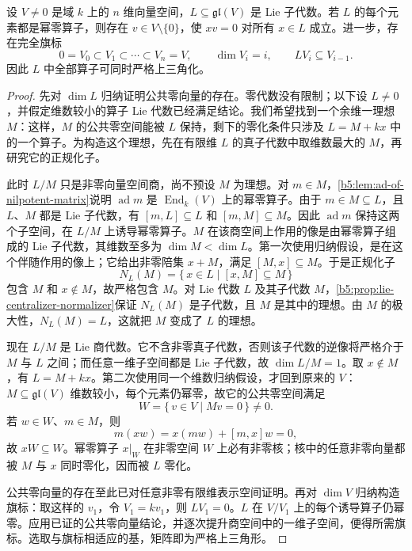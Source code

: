 \begin{theorem}\label{b5:thm:engel-common-zero}
	设 \(V\ne0\) 是域 \(k\) 上的 \(n\) 维向量空间，\(L\subseteq\mathfrak{gl}(V)\) 是 Lie 子代数。若 \(L\) 的每个元素都是幂零算子，则存在 \(v\in V\setminus\{0\}\)，使 \(xv=0\) 对所有 \(x\in L\) 成立。进一步，存在完全旗标
	\[
		0=V_0\subset V_1\subset\cdots\subset V_n=V,\qquad \dim V_i=i,\qquad LV_i\subseteq V_{i-1}.
	\]
	因此 \(L\) 中全部算子可同时严格上三角化。
\end{theorem}
\begin{proof}
	先对 \(\dim L\) 归纳证明公共零向量的存在。零代数没有限制；以下设 \(L\ne0\)，并假定维数较小的算子 Lie 代数已经满足结论。我们希望找到一个余维一理想 \(M\)：这样，\(M\) 的公共零空间能被 \(L\) 保持，剩下的零化条件只涉及 \(L=M+kx\) 中的一个算子。为构造这个理想，先在有限维 \(L\) 的真子代数中取维数最大的 \(M\)，再研究它的正规化子。

	此时 \(L/M\) 只是非零向量空间商，尚不预设 \(M\) 为理想。对 \(m\in M\)，\cref{b5:lem:ad-of-nilpotent-matrix}说明 \(\operatorname{ad}m\) 是 \(\operatorname{End}_k(V)\) 上的幂零算子。由于 \(m\in M\subseteq L\)，且 \(L\)、\(M\) 都是 Lie 子代数，有 \([m,L]\subseteq L\) 和 \([m,M]\subseteq M\)。因此 \(\operatorname{ad}m\) 保持这两个子空间，在 \(L/M\) 上诱导幂零算子。\(M\) 在该商空间上作用的像是由幂零算子组成的 Lie 子代数，其维数至多为 \(\dim M<\dim L\)。第一次使用归纳假设，是在这个伴随作用的像上；它给出非零陪集 \(x+M\)，满足 \([M,x]\subseteq M\)。于是正规化子
	\[
		N_L(M)=\bigl\{\,x\in L\mid[x,M]\subseteq M\,\bigr\}
	\]
	包含 \(M\) 和 \(x\notin M\)，故严格包含 \(M\)。对 Lie 代数 \(L\) 及其子代数 \(M\)，\cref{b5:prop:lie-centralizer-normalizer}保证 \(N_L(M)\) 是子代数，且 \(M\) 是其中的理想。由 \(M\) 的极大性，\(N_L(M)=L\)，这就把 \(M\) 变成了 \(L\) 的理想。

	现在 \(L/M\) 是 Lie 商代数。它不含非零真子代数，否则该子代数的逆像将严格介于 \(M\) 与 \(L\) 之间；而任意一维子空间都是 Lie 子代数，故 \(\dim L/M=1\)。取 \(x\notin M\)，有 \(L=M+kx\)。第二次使用同一个维数归纳假设，才回到原来的 \(V\)：\(M\subseteq\mathfrak{gl}(V)\) 维数较小，每个元素仍幂零，故它的公共零空间满足
	\[
		W=\{\,v\in V\mid Mv=0\,\}\ne0.
	\]
	若 \(w\in W\)、\(m\in M\)，则
	\[
		m(xw)=x(mw)+[m,x]w=0,
	\]
	故 \(xW\subseteq W\)。幂零算子 \(x|_W\) 在非零空间 \(W\) 上必有非零核；核中的任意非零向量都被 \(M\) 与 \(x\) 同时零化，因而被 \(L\) 零化。

	公共零向量的存在至此已对任意非零有限维表示空间证明。再对 \(\dim V\) 归纳构造旗标：取这样的 \(v_1\)，令 \(V_1=kv_1\)，则 \(LV_1=0\)。\(L\) 在 \(V/V_1\) 上的每个诱导算子仍幂零。应用已证的公共零向量结论，并逐次提升商空间中的一维子空间，便得所需旗标。选取与旗标相适应的基，矩阵即为严格上三角形。
\end{proof}

